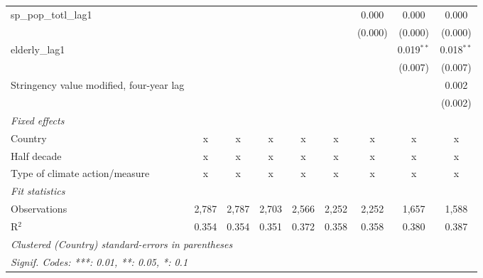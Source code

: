 \begin{tabular}{lcccccccc}
   sp\_pop\_totl\_lag1                               &              &              &         &              &             & 0.000   & 0.000        & 0.000\\   
                                                     &              &              &         &              &             & (0.000) & (0.000)      & (0.000)\\   
   elderly\_lag1                                     &              &              &         &              &             &         & 0.019$^{**}$ & 0.018$^{**}$\\   
                                                     &              &              &         &              &             &         & (0.007)      & (0.007)\\   
   Stringency value modified, four-year lag          &              &              &         &              &             &         &              & 0.002\\   
                                                     &              &              &         &              &             &         &              & (0.002)\\   
   \emph{Fixed effects}\\
   Country                                           & x            & x            & x       & x            & x           & x       & x            & x\\  
   Half decade                                       & x            & x            & x       & x            & x           & x       & x            & x\\  
   Type of climate action/measure                    & x            & x            & x       & x            & x           & x       & x            & x\\  
   \midrule \emph{Fit statistics}\\
   Observations                                      & 2,787        & 2,787        & 2,703   & 2,566        & 2,252       & 2,252   & 1,657        & 1,588\\  
   R$^2$                                             & 0.354        & 0.354        & 0.351   & 0.372        & 0.358       & 0.358   & 0.380        & 0.387\\  
   \midrule
   \multicolumn{9}{l}{\emph{Clustered (Country) standard-errors in parentheses}}\\
   \multicolumn{9}{l}{\emph{Signif. Codes: ***: 0.01, **: 0.05, *: 0.1}}\\
\end{tabular}
\par\endgroup


